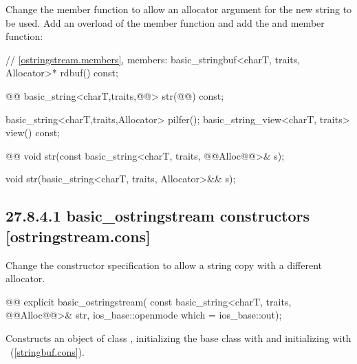 \documentclass[ebook,11pt,article]{memoir}
\begin{document}
Change the  member function to allow an allocator argument for the new string to be used.
Add an overload of the  member function and add the  and  member function:

\begin{codeblock}
    // \ref{ostringstream.members}, members:
    basic_stringbuf<charT, traits, Allocator>* rdbuf() const;

    @@
    basic_string<charT,traits,@@> str(@@) const;
\end{codeblock}
\begin{addedblock}\begin{codeblock}
    basic_string<charT,traits,Allocator> pilfer();
    basic_string_view<charT, traits> view() const;
\end{codeblock}\end{addedblock}
\begin{codeblock}
    @@
    void str(const basic_string<charT, traits, @@Alloc@@>& s);
\end{codeblock}
\begin{addedblock}
\begin{codeblock}
    void str(basic_string<charT, traits, Allocator>&& s);
\end{codeblock}
\end{addedblock}

\subsection{27.8.4.1 basic\_ostringstream constructors [ostringstream.cons]}
Change the constructor specification to allow a string copy with a different allocator.
\begin{itemdecl}
@@
explicit basic_ostringstream(
  const basic_string<charT, traits, @@Alloc@@>& str,
  ios_base::openmode which = ios_base::out);
\end{itemdecl}

\begin{itemdescr}
\pnum
\effects
Constructs an object of class
,
initializing the base class with
and initializing  with
~(\ref{stringbuf.cons}).
\end{itemdescr}
\end{document}
